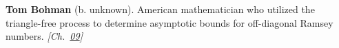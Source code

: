 \textbf{Tom Bohman} (b. unknown). American mathematician who utilized the triangle-free process to determine asymptotic bounds for off-diagonal Ramsey numbers. \emph{[Ch.~\hyperref[ch:arrowtheoremtopology]{09}]}


